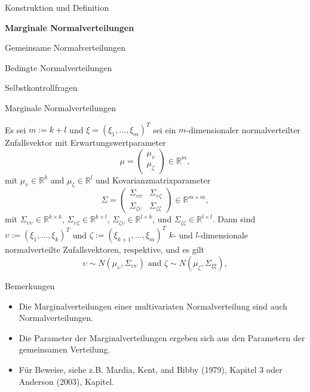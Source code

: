 \documentclass[
  8pt,
  ignorenonframetext,
]{beamer}
\providecommand{\tightlist}{%
  \setlength{\itemsep}{0pt}\setlength{\parskip}{0pt}}
\newcommand{\ups}{\upsilon}
\begin{document}
\begin{frame}{}
\protect\hypertarget{section-4}{}
\large
{}
\vfill

Konstruktion und Definition

\textbf{Marginale Normalverteilungen}

Gemeinsame Normalverteilungen

Bedingte Normalverteilungen

Selbstkontrollfragen \vfill
\end{frame}

\begin{frame}{Marginale Normalverteilungen}
\protect\hypertarget{marginale-normalverteilungen}{}
\footnotesize
\begin{theorem}
\justifying
\normalfont
Es sei $m := k + l$ und $\xi = (\xi_1,...,\xi_m)^T$ sei ein $m$-dimensionaler
normalverteilter Zufallsvektor mit Erwartungswertparameter
\begin{equation}
\mu =
\left(\begin{matrix}
\mu_\ups \\
\mu_\zeta
\end{matrix}\right) \in \mathbb{R}^m,
\end{equation}
mit $\mu_\ups \in \mathbb{R}^k$ and $\mu_\zeta \in \mathbb{R}^l$ und Kovarianzmatrixparameter
\begin{equation}
\Sigma =
\left(\begin{matrix}
\Sigma_{\ups\ups}   & \Sigma_{\ups\zeta} \\
\Sigma_{\zeta\ups}  & \Sigma_{\zeta\zeta}
\end{matrix}\right) \in \mathbb{R}^{m \times m},
\end{equation}
mit $\Sigma_{\ups\ups}   \in \mathbb{R}^{k \times k}$,
    $\Sigma_{\ups\zeta}  \in \mathbb{R}^{k \times l}$,
    $\Sigma_{\zeta\ups}  \in \mathbb{R}^{l \times k}$,
und $\Sigma_{\zeta\zeta} \in \mathbb{R}^{l \times l}$.
Dann sind $\ups := (\xi_1,...,\xi_k)^T$ und $\zeta := (\xi_{k+1}, ...,\xi_m)^T$
$k$- und $l$-dimensionale normalverteilte Zufallsvektoren, respektive, und es gilt
\begin{equation}
\ups \sim N(\mu_\ups,\Sigma_{\ups\ups}) \mbox{ and } \zeta \sim N(\mu_\zeta,\Sigma_{\xi\xi}),
\end{equation}
\end{theorem}

Bemerkungen

\begin{itemize}
\tightlist
\item
  Die Marginalverteilungen einer multivariaten Normalverteilung sind
  auch Normalverteilungen.
\item
  Die Parameter der Marginalverteilungen ergeben sich aus den Parametern
  der gemeinsamen Verteilung.
\item
  Für Beweise, siehe z.B. Mardia, Kent, and Bibby (1979), Kapitel 3 oder
  Anderson (2003), Kapitel.
\end{itemize}
\end{frame}
\end{document}
